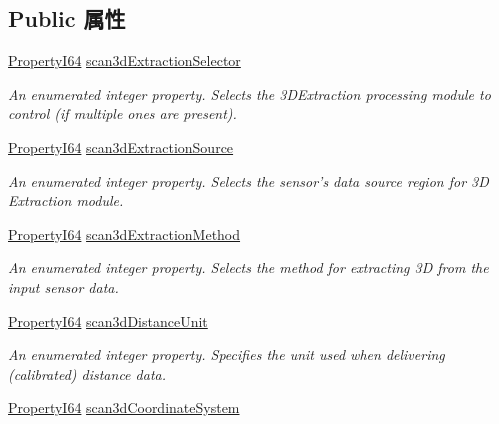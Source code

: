 \subsection*{Public 属性}
\begin{DoxyCompactItemize}
\item 
\hyperlink{group___common_interface_ga81749b2696755513663492664a18a893}{Property\+I64} \hyperlink{classmv_i_m_p_a_c_t_1_1acquire_1_1_gen_i_cam_1_1_scan3d_control_a025778e70e151c604f938a48dc962a0c}{scan3d\+Extraction\+Selector}
\begin{DoxyCompactList}\small\item\em An enumerated integer property. Selects the 3\+D\+Extraction processing module to control (if multiple ones are present). \end{DoxyCompactList}\item 
\hyperlink{group___common_interface_ga81749b2696755513663492664a18a893}{Property\+I64} \hyperlink{classmv_i_m_p_a_c_t_1_1acquire_1_1_gen_i_cam_1_1_scan3d_control_a68ede1779a64fd607f9d30a8b789875f}{scan3d\+Extraction\+Source}
\begin{DoxyCompactList}\small\item\em An enumerated integer property. Selects the sensor's data source region for 3\+D Extraction module. \end{DoxyCompactList}\item 
\hyperlink{group___common_interface_ga81749b2696755513663492664a18a893}{Property\+I64} \hyperlink{classmv_i_m_p_a_c_t_1_1acquire_1_1_gen_i_cam_1_1_scan3d_control_a81f9b35309a0ed35ba127f1fa9ef2788}{scan3d\+Extraction\+Method}
\begin{DoxyCompactList}\small\item\em An enumerated integer property. Selects the method for extracting 3\+D from the input sensor data. \end{DoxyCompactList}\item 
\hyperlink{group___common_interface_ga81749b2696755513663492664a18a893}{Property\+I64} \hyperlink{classmv_i_m_p_a_c_t_1_1acquire_1_1_gen_i_cam_1_1_scan3d_control_a8c28d5ecbb3763fa21b93814aab6cce1}{scan3d\+Distance\+Unit}
\begin{DoxyCompactList}\small\item\em An enumerated integer property. Specifies the unit used when delivering (calibrated) distance data. \end{DoxyCompactList}\item 
\hyperlink{group___common_interface_ga81749b2696755513663492664a18a893}{Property\+I64} \hyperlink{classmv_i_m_p_a_c_t_1_1acquire_1_1_gen_i_cam_1_1_scan3d_control_a2a7abf5a96c5142310d317c63c2c0b4f}{scan3d\+Coordinate\+System}

\end{DoxyCompactItemize}
